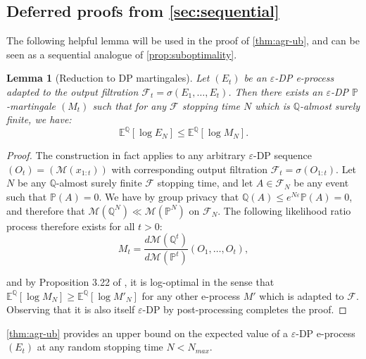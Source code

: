 \documentclass{article}
\newcommand{\Null}{\mathbb{P}}
\newcommand{\E}{\mathbb{E}}
\newcommand{\Alt}{\mathbb{Q}}
\newcommand{\M}{\mathcal{M}}
\newcommand{\eps}{\varepsilon}
\newtheorem{lemma}{Lemma}[theorem]
\begin{document}
\subsection{Deferred proofs from \cref{sec:sequential}}
\label{sec:deferred_sequential}

The following helpful lemma will be used in the proof of \cref{thm:agr-ub}, and can be seen as a sequential analogue of \cref{prop:suboptimality}.

\begin{lemma}[Reduction to DP martingales]\label{lem:martingale-reduction}
        Let $(E_t)$ be an $\eps$-DP e-process adapted to the output filtration $\mathcal{F}_t = \sigma(E_1, \ldots, E_t)$. Then there exists an $\varepsilon$-DP $\Null$-martingale $(M_t)$ such that for any $\mathcal{F}$ stopping time $N$ which is $\Alt$-almost surely finite, we have:
        \begin{equation*}
            \E^\Alt[\log E_N] \leq \E^\Alt[\log M_N].
        \end{equation*}
        \end{lemma}

    \begin{proof}
        The construction in fact applies to any arbitrary $\varepsilon$-DP sequence $(O_t) = (\M(x_{1:t}))$ with corresponding output filtration $\mathcal{F}_t = \sigma(O_{1:t})$.
       Let $N$ be any $\Alt$-almost surely finite $\mathcal{F}$ stopping time, and let $A \in \mathcal{F}_N$ be any event such that $\Null(A)=0$. We have by group privacy that $\Alt(A) \leq e^{N\varepsilon} \Null(A) = 0$, and therefore that $\M(\Alt^N) \ll \M(\Null^N)$ on $\mathcal{F}_N$. The following likelihood ratio process therefore exists for all $t > 0$:
        \begin{equation*}
            M_t = \frac{d\M(\Alt^t)}{d\M(\Null^t)}(O_1, \ldots, O_t),
        \end{equation*}

        and by Proposition 3.22 of \citet{ramdasHypothesisTestingEvalues}, it is log-optimal in the sense that $\mathbb{E}^\Alt[\log M_N] \geq \mathbb{E}^\Alt[\log M'_N]$ for any other e-process $M'$ which is adapted to $\mathcal{F}$. Observing that it is also itself $\varepsilon$-DP by post-processing completes the proof. 
    \end{proof}

    \vspace{1cm}

\cref{thm:agr-ub} provides an upper bound on the expected value of a $\eps$-DP e-process $(E_t)$ at any random stopping time $N < N_{max}$.
\end{document}
